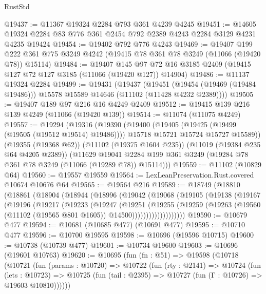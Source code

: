\begin{lexlean}{RustStd}
\begin{coremodule}
@19437 := @11367 @19324 @2284 @793 @361 @4239 @4245
@19451 := @14605 @19324 @2284 @83 @776 @361 @2454 @792 @2389 @4243 @2284 @3129 @4231 @4235 @19424
@19454 := @19402 @792 @776 @4243
@19469 := @19407
    @199
    @222
    @361
    @775
    @3249
    @4242
    (@19415 @78 @361 @78 @3249 (@11066 (@19420 @78)) @15114)
@19484 := @19407
    @145
    @97
    @72
    @16
    @3185
    @2409
    (@19415 @127 @72 @127 @3185 (@11066 (@19420 @127)) @14904)
@19486 := @11137 @19324 @2284
@19499 := @19431
    (@19437
      (@19451 (@19454 (@19469 (@19484 @19486))) @15578 @15589 @14646 (@11102 (@11428 @4232 @2389))))
@19505 := @19407 @189 @97 @216 @16 @4249 @2409
@19512 := @19415 @139 @216 @139 @4249 (@11066 (@19420 @139))
@19514 := @11074 (@11075 @4249)
@19557 := @19294
    (@19316
      (@19390
        (@19400
          (@19405 (@19425 (@19499 (@19505 (@19512 @19514) @19486))))
          @15718
          @15721
          @15724
          @15727
          @15589))
      (@19355 (@19368 @62))
      (@11102 (@19375 @1604 @235))
      (@11019 (@19384 @235 @64 @4205 @2389))
      (@11629
        @19041
        @2284
        @199
        @361
        @3249
        (@19284 @78 @361 @78 @3249 (@11066 (@19289 @78)) @15114)))
@19559 := @11102 (@10829 @64)
@19560 := @19557 @19559
@19564 := LexLeanPreservation.Rust.covered @10674 @10676 @64
@19565 := @19564 @216
@19589 := @18749
    (@18810
      (@18861
        (@18904
          (@18944
            (@18996
              (@19042
                (@19068
                  (@19105
                    (@19138
                      (@19167
                        (@19196
                          (@19217
                            (@19233
                              (@19247
                                (@19251
                                  (@19255
                                    (@19259
                                      (@19263
                                        (@19560
                                          (@11102 (@19565 @801 @1605))
                                          @14500)))))))))))))))))))
@19590 := @10679 @477
@19594 := @10681 (@10685 @477) (@10691 @477)
@19595 := @10710 @477
@19596 := @10700 @19595
@19598 := @10696 (@19596 @10715)
@19600 := @10738 (@10739 @477)
@19601 := @10734 @19600
@19603 := @10696 (@19601 @10763)
@19620 := @10695
    (fun (fn : @51) =>
    @19598
      (@10718
        (@10721
          (fun (params : @10720) =>
          @10722
            (fun (rty : @2141) =>
            @10724
              (fun (lets : @10723) =>
              @10725 (fun (tail : @2395) => @10727 (fun (Γ : @10726) => @19603 @10810))))))

\end{coremodule}
\end{lexlean}
